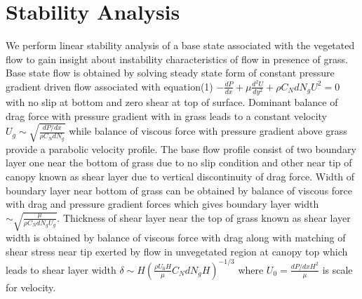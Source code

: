 \documentclass[aps,twocolumn,floatfix,prl,10pt]{revtex4-1}
\newcommand{\bu}{\mathbf{u}}
\newcommand{\del}{\partial}
\begin{document}

  
\section{Stability Analysis}
We perform linear stability analysis of a base state associated with the vegetated flow to gain insight about instability characteristics of flow in presence of grass.
Base state flow is obtained by solving steady state form of constant pressure gradient driven flow associated with equation(1)
$-\frac{dP}{dx}+\mu\frac{d^2U}{dy^2}+\rho C_N d N_gU^2=0$ with no slip at bottom and zero shear at top of surface. Dominant balance of drag force with pressure gradient with in
grass leads to a constant velocity $U_g \sim \sqrt{\frac{dP/dx}{\rho C_N dN_g}}$ while balance of viscous force with pressure gradient above grass provide a parabolic velocity profile.
The base flow profile consist of two boundary layer one near the bottom of grass due to no slip condition and other near tip of canopy known as shear layer due to vertical discontinuity 
of drag force. Width of boundary layer near bottom of grass can be obtained by balance of viscous force with drag and pressure gradient forces which gives boundary layer
width $\sim \sqrt{\frac{\mu}{\rho C_NdN_g U_g}}$. Thickness of shear layer near the top of grass known as shear layer width is obtained by balance of viscous force 
with drag along with matching of shear stress near tip exerted by flow in unvegetated region at canopy top which leads to shear layer 
width $\delta \sim  H\left(\frac{\rho U_0 H}{\mu} C_N d N_g H\right)^{-1/3}$ where $U_0 = \frac{dP/dxH^2}{\mu}$ is scale for velocity.
 
\end{document}
